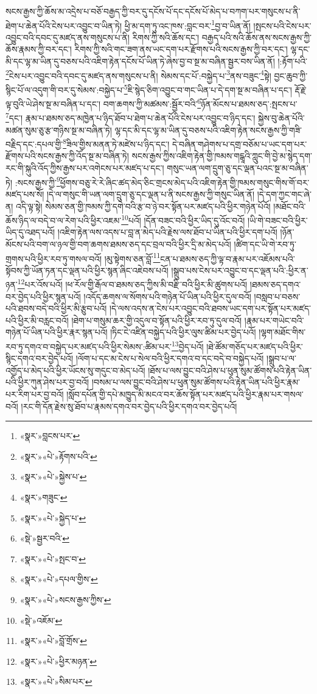 སངས་རྒྱས་ཀྱི་ཆོས་མ་འདྲེས་པ་བཅོ་བརྒྱད་ཀྱི་བར་དུ་དངོས་པོ་དང་དངོས་པོ་མེད་པ་བཀག་པར་གསུངས་པ་ནི་ཐེག་པ་ཆེན་པོའི་ངེས་པར་འབྱུང་བ་ཡིན་ཏེ། ཕྱི་མ་དག་ཏུ་འང་ཁས་:བླང་བར་\footnote{«སྣར་»བླངས་པར་}བྱ་བ་ཡིན་ནོ། །སྤངས་པའི་ངེས་པར་འབྱུང་བའི་དབང་དུ་མཛད་ནས་གསུངས་པ་ནི། རིགས་ཀྱི་སའི་ཆོས་དང་། བརྒྱད་པའི་སའི་ཆོས་ནས་སངས་རྒྱས་ཀྱི་ཆོས་རྣམས་ཀྱི་བར་དང་། རིགས་ཀྱི་སའི་གང་ཟག་ནས་ཡང་དག་པར་རྫོགས་པའི་སངས་རྒྱས་ཀྱི་བར་དང་། ལྷ་དང་མི་དང་ལྷ་མ་ཡིན་དུ་བཅས་པའི་འཇིག་རྟེན་དངོས་པོ་ཡིན་ཏེ་ཞེས་བྱ་བ་སྔ་མ་བཞིན་སྦྱར་བས་ཡིན་ནོ། །:རྟོག་པའི་\footnote{«སྣར་»«པེ་»རྟོགས་པའི་}ངེས་པར་འབྱུང་བའི་དབང་དུ་མཛད་ནས་གསུངས་པ་ནི། སེམས་དང་པོ་:བསྐྱེད་པ་\footnote{«སྣར་»«པེ་»སྐྱེས་པ་}ནས་བཟུང་\footnote{«སྣར་»གཟུང་}སྟེ། བྱང་ཆུབ་ཀྱི་སྙིང་པོ་ལ་འདུག་གི་བར་དུ་སེམས་:བསྐྱེད་པ་\footnote{«སྣར་»«པེ་»སྐྱེད་པ་}ཇི་སྙེད་ཅིག་འབྱུང་བ་གང་ཡིན་པ་དེ་དག་སྔ་མ་བཞིན་པ་དང་། རྡོ་རྗེ་ལྟ་བུའི་ཡེ་ཤེས་སྔ་མ་བཞིན་པ་དང་། བག་ཆགས་ཀྱི་མཚམས་:སྦྱོར་བའི་\footnote{«སྡེ་»སྦྱར་བའི་}ཉོན་མོངས་པ་ཐམས་ཅད་:སྤངས་པ་\footnote{«སྣར་»«པེ་»སྤང་བ་}དང་། རྣམ་པ་ཐམས་ཅད་མཁྱེན་པ་ཉིད་ཐོབ་པ་ཐེག་པ་ཆེན་པོའི་ངེས་པར་འབྱུང་བ་ཉིད་དང་། སྐྱེས་བུ་ཆེན་པོའི་མཚན་སུམ་ཅུ་རྩ་གཉིས་སྔ་མ་བཞིན་ཏེ། ལྷ་དང་མི་དང་ལྷ་མ་ཡིན་དུ་བཅས་པའི་འཇིག་རྟེན་སངས་རྒྱས་ཀྱི་གཟི་བརྗིད་དང་:དཔལ་གྱི་\footnote{«སྣར་»«པེ་»དཔལ་གྱིས་}ཟིལ་གྱིས་མནན་ཏེ་མཛེས་པ་ཉིད་དང་། དེ་བཞིན་གཤེགས་པ་དགྲ་བཅོམ་པ་ཡང་དག་པར་རྫོགས་པའི་སངས་རྒྱས་ཀྱི་འོད་སྔ་མ་བཞིན་ཏེ། སངས་རྒྱས་ཀྱིས་འཇིག་རྟེན་གྱི་ཁམས་གངྒཱའི་ཀླུང་གི་བྱེ་མ་སྙེད་དག་རང་གི་སྐུའི་འོད་ཀྱིས་རྒྱས་པར་འགེངས་པར་མཛད་པ་དང་། གསུང་ཡན་ལག་དྲུག་ཅུ་དང་ལྡན་པའང་སྔ་མ་བཞིན་ཏེ། :སངས་རྒྱས་ཀྱི་\footnote{«སྣར་»«པེ་»སངས་རྒྱས་ཀྱིས་}ཕྱོགས་བཅུ་རེ་རེ་ཞིང་ཚད་མེད་ཅིང་གྲངས་མེད་པའི་འཇིག་རྟེན་གྱི་ཁམས་གསུང་གིས་གོ་བར་མཛད་པས་སོ། །དེ་ལ་གསུང་གི་ཡན་ལག་དྲུག་ཅུ་དང་ལྡན་པ་ནི་སངས་རྒྱས་ཀྱི་གསུང་ཡིན་ནོ། །དེ་དག་ཀྱང་གང་ཞེ་ན། འདི་ལྟ་སྟེ། སེམས་ཅན་གྱི་ཁམས་ཀྱི་དགེ་བའི་རྩ་བ་ཉེ་བར་སྟོན་པར་མཛད་པའི་ཕྱིར་གཉེན་པོའོ། །མཐོང་བའི་ཆོས་ཉིད་ལ་བདེ་བ་ལ་རེག་པའི་ཕྱིར་འཇམ་\footnote{«སྡེ་»འཇོམ་}པའོ། །དོན་བཟང་བའི་ཕྱིར་ཡིད་དུ་འོང་བའོ། །ཡི་གེ་བཟང་བའི་ཕྱིར་ཡིད་དུ་འཐད་པའོ། །འཇིག་རྟེན་ལས་འདས་པ་བླ་ན་མེད་པའི་རྗེས་ལས་ཐོབ་པ་ཡིན་པའི་ཕྱིར་དག་པའོ། །ཉོན་མོངས་པའི་བག་ལ་ཉལ་གྱི་བག་ཆགས་ཐམས་ཅད་དང་བྲལ་བའི་ཕྱིར་དྲི་མ་མེད་པའོ། །ཚིག་དང་ཡི་གེ་རབ་ཏུ་གྲགས་པའི་ཕྱིར་རབ་ཏུ་གསལ་བའོ། །མུ་སྟེགས་ཅན་བློ་\footnote{«སྣར་»«པེ་»བློ་གྲོས་}ངན་པ་ཐམས་ཅད་ཀྱི་ལྟ་བ་རྣམ་པར་འཇོམས་པའི་སྟོབས་ཀྱི་ཡོན་ཏན་དང་ལྡན་པའི་ཕྱིར་སྙན་ཞིང་འཇེབས་པའོ། །སྒྲུབ་པས་ངེས་པར་འབྱུང་བ་དང་ལྡན་པའི་:ཕྱིར་ན་ཉན་\footnote{«སྣར་»«པེ་»ཕྱིར་མཉན་}པར་འོས་པའོ། །ཕ་རོལ་གྱི་རྒོལ་བ་ཐམས་ཅད་ཀྱིས་མི་བརྫི་བའི་ཕྱིར་མི་ཚུགས་པའོ། །ཐམས་ཅད་དགའ་བར་བྱེད་པའི་ཕྱིར་སྙན་པའོ། །འདོད་ཆགས་ལ་སོགས་པའི་གཉེན་པོ་ཡིན་པའི་ཕྱིར་དུལ་བའོ། །བསླབ་པ་བཅས་པའི་ཐབས་བདེ་བའི་ཕྱིར་མི་རྩུབ་པའོ། །དེ་ལས་འདས་ན་ངེས་པར་འབྱུང་བའི་ཐབས་ཡང་དག་པར་སྟོན་པར་མཛད་པའི་ཕྱིར་མི་བརླང་བའོ། །ཐེག་པ་གསུམ་ཆར་གྱི་འདུལ་བ་སྟོན་པའི་ཕྱིར་རབ་ཏུ་དུལ་བའོ། །རྣམ་པར་གཡེང་བའི་གཉེན་པོ་ཡིན་པའི་ཕྱིར་རྣར་སྙན་པའོ། །ཏིང་ངེ་འཛིན་བསྐྱེད་པའི་ཕྱིར་ལུས་ཚིམ་པར་བྱེད་པའོ། །ལྷག་མཐོང་གིས་རབ་ཏུ་དགའ་བ་བསྐྱེད་པར་མཛད་པའི་ཕྱིར་སེམས་:ཚིམ་པར་\footnote{«སྣར་»«པེ་»སིམ་པར་}བྱེད་པའོ། །ཐེ་ཚོམ་གཅོད་པར་མཛད་པའི་ཕྱིར་སྙིང་དགའ་བར་བྱེད་པའོ། །ལོག་པ་དང་མ་ངེས་པ་སེལ་བའི་ཕྱིར་དགའ་བ་དང་བདེ་བ་བསྐྱེད་པའོ། །སྒྲུབ་པ་ལ་འགྱོད་པ་མེད་པའི་ཕྱིར་ཡོངས་སུ་གདུང་བ་མེད་པའོ། །ཐོས་པ་ལས་བྱུང་བའི་ཤེས་པ་ཕུན་སུམ་ཚོགས་པའི་རྟེན་ཡིན་པའི་ཕྱིར་ཀུན་ཤེས་པར་བྱ་བའོ། །བསམ་པ་ལས་བྱུང་བའི་ཤེས་པ་ཕུན་སུམ་ཚོགས་པའི་རྟེན་ཡིན་པའི་ཕྱིར་རྣམ་པར་རིག་པར་བྱ་བའོ། །སློབ་དཔོན་གྱི་དཔེ་མཁྱུད་མི་མངའ་བར་ཆོས་སྟོན་པར་མཛད་པའི་ཕྱིར་རྣམ་པར་གསལ་བའོ། །རང་གི་དོན་རྗེས་སུ་ཐོབ་པ་རྣམས་དགའ་བར་བྱེད་པའི་ཕྱིར་དགའ་བར་བྱེད་པའོ། 
